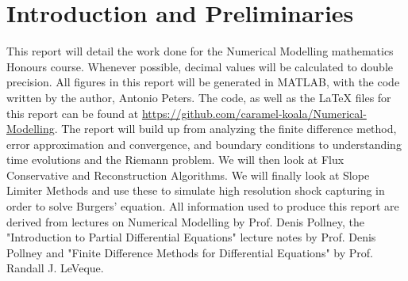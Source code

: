 \chapter{Introduction and Preliminaries}
This report will detail the work done for the Numerical Modelling mathematics Honours course. Whenever possible, decimal values will be calculated to double precision. All figures in this report will be generated in MATLAB, with the code written by the author, Antonio Peters. The code, as well as the LaTeX files for this report can be found at \url{https://github.com/caramel-koala/Numerical-Modelling}. The report will build up from analyzing the finite difference method, error approximation and convergence, and boundary conditions to understanding time evolutions and the Riemann problem. We will then look at Flux Conservative and Reconstruction Algorithms. We will finally look at Slope Limiter Methods and use these to simulate high resolution shock capturing in order to solve Burgers' equation. All information used to produce this report are derived from lectures on Numerical Modelling by Prof. Denis Pollney, the "Introduction to Partial Differential Equations" lecture notes by Prof. Denis Pollney and "Finite Difference Methods for Differential Equations" by Prof. Randall J. LeVeque.